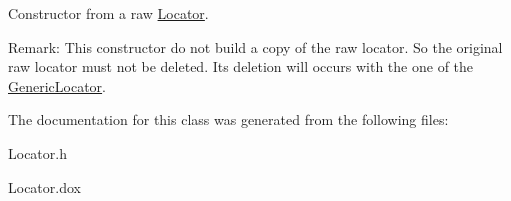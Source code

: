 Constructor from a raw \hyperlink{classHurricane_1_1Locator}{Locator}.

\begin{DoxyParagraph}{Remark\+:}
This constructor do not build a copy of the raw locator. So the original raw locator must not be deleted. It\textquotesingle{}s deletion will occurs with the one of the \hyperlink{classHurricane_1_1GenericLocator}{Generic\+Locator}. 
\end{DoxyParagraph}


The documentation for this class was generated from the following files\+:\begin{DoxyCompactItemize}
\item 
Locator.\+h\item 
Locator.\+dox\end{DoxyCompactItemize}
